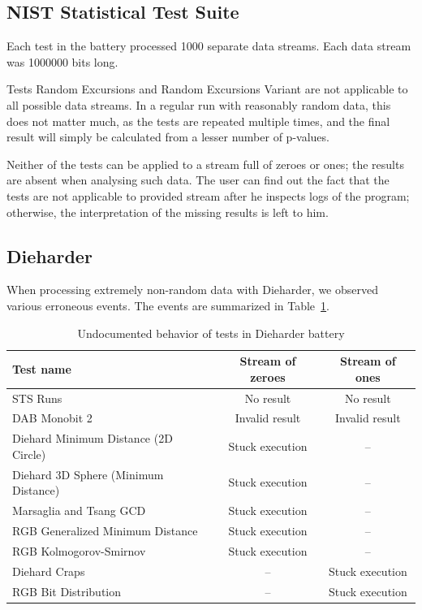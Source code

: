 \documentclass[
	digital,    %
	oneside,
	color,
	11pt,
	nocover,
	notable,
	nolof,
	nolot,
]{fithesis3}
\theoremstyle{definition}
\theoremstyle{remark}
\begin{document}
\subsection*{NIST Statistical Test Suite}
Each test in the battery processed 1000 separate data streams. Each data stream was 1000000 bits long.

Tests Random Excursions and Random Excursions Variant are not applicable to all possible data streams. In a regular run with reasonably random data, this does not matter much, as the tests are repeated multiple times, and the final result will simply be calculated from a lesser number of p-values. 

Neither of the tests can be applied to a stream full of zeroes or ones; the results are absent when analysing such data. The user can find out the fact that the tests are not applicable to provided stream after he inspects logs of the program; otherwise, the interpretation of the missing results is left to him.

\subsection*{Dieharder}
When processing extremely non-random data with Dieharder, we observed various erroneous events. The events are summarized in Table~\ref{tab:dieharder_errors}. 

\begin{table}[h!]
\begin{nomar}
\centering
\begin{tabular}{@{}lcc@{}} \toprule
\textbf{Test name}                   & \textbf{Stream of zeroes} & \textbf{Stream of ones} \\ \midrule
STS Runs                             & No result                & No result                \\
DAB Monobit 2 						 & Invalid result           & Invalid result           \\
Diehard Minimum Distance (2D Circle) & Stuck execution          & --                        \\
Diehard 3D Sphere (Minimum Distance) & Stuck execution          & --                        \\
Marsaglia and Tsang GCD              & Stuck execution          & --                        \\
RGB Generalized Minimum Distance     & Stuck execution          & --                        \\
RGB Kolmogorov-Smirnov               & Stuck execution          & --                        \\  
Diehard Craps                        & --                       & Stuck execution          \\
RGB Bit Distribution                 & --                       & Stuck execution          \\ \bottomrule
\end{tabular}
\end{nomar}
\caption{Undocumented behavior of tests in Dieharder battery}
\label{tab:dieharder_errors}
\end{table}
\end{document}
